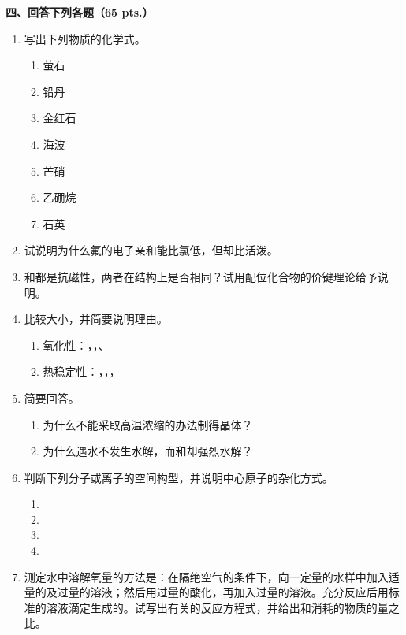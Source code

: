 \vspace{0.5cm}
\noindent\textbf{四、回答下列各题（65 pts.）}

\begin{enumerate}[label=\arabic*., start=1, itemsep=1.5ex]
    \item 写出下列物质的化学式。
    \begin{enumerate}[label=(\arabic*), itemsep=1ex]
        \item 萤石
        \item 铅丹
        \item 金红石
        \item 海波
        \item 芒硝
        \item 乙硼烷
        \item 石英
    \end{enumerate}
    \item 试说明为什么氟的电子亲和能比氯低，但却比活泼。
    \item \ce{[Ni(CO)4]}和都是抗磁性，两者在结构上是否相同？试用配位化合物的价键理论给予说明。
    \item 比较大小，并简要说明理由。
    \begin{enumerate}[label=(\arabic*), itemsep=1ex]
        \item 氧化性：，，、
        \item 热稳定性：，，，
    \end{enumerate}
    \item 简要回答。
    \begin{enumerate}[label=(\arabic*), itemsep=1ex]
        \item 为什么不能采取高温浓缩的办法制得晶体？
        \item 为什么遇水不发生水解，而和却强烈水解？
    \end{enumerate}
    \item 判断下列分子或离子的空间构型，并说明中心原子的杂化方式。
    \begin{enumerate}[label=(\arabic*), itemsep=1ex]
        \item {}
        \item {}
        \item {}
        \item \ce{[Fe(CO)5]}
    \end{enumerate}
    \item 测定水中溶解氧量的方法是：在隔绝空气的条件下，向一定量的水样中加入适量的及过量的溶液；然后用过量的酸化，再加入过量的溶液。充分反应后用标准的溶液滴定生成的。试写出有关的反应方程式，并给出和消耗的物质的量之比。

\end{enumerate}
